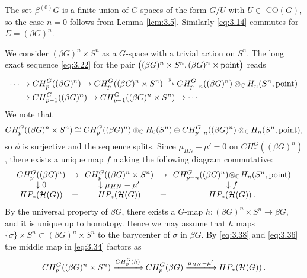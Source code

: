 The set $\beta^{(0)} G$ is a finite union of $G$-spaces of the form $G/U$ with 
$U \in$ CO$ (G)$, so the case $n = 0$ follows from Lemma \ref{lem:3.5}.
Similarly \eqref{eq:3.14} commutes for $\Sigma = (\beta G)^n$.

We consider $(\beta G)^n \times S^n$ as a $G$-space with a trivial action on $S^n$. The
long exact sequence \eqref{eq:3.22} for the pair 
$\big( (\beta G)^n \times S^n , (\beta G)^n \times \mathrm{point} \big)$ reads
\[
\begin{split}
\cdots & \to CH_p^G ((\beta G)^n ) \to CH_p^G ((\beta G)^n \times S^n ) \xrightarrow{\phi}
CH_{p-n}^G ((\beta G)^n ) \otimes_{\mathbb C} H_n (S^n ,\mathrm{point}) \\
& \to CH_{p-1}^G ((\beta G)^n ) \to CH_{p-1}^G ((\beta G)^n \times S^n ) \to \cdots
\end{split}
\]
We note that \pagebreak[3]
\begin{equation*}
CH_p^G ((\beta G)^n \times S^n ) \cong CH_p^G ((\beta G)^n ) \otimes_{\mathbb C} H_0 (S^n ) 
\oplus CH_{p-n}^G ((\beta G)^n ) \otimes_{\mathbb C} H_n (S^n ,\mathrm{point}) ,
\end{equation*}
so $\phi$ is surjective and the sequence splits. Since $\mu_{HN} - \mu' = 0$ on 
$CH_*^G ((\beta G)^n )$, there exists a unique map $f$ making the following diagram commutative:
\begin{equation}\label{eq:3.34}
\begin{array}{ccccc}
\!\! CH_p^G ((\beta G)^n ) \!\! & \to & \!\! CH_p^G ((\beta G)^n \times S^n ) \!\! & \to &
\!\! CH_{p-n}^G ((\beta G)^n ) \! \otimes_{\mh C} \! H_n (S^n ,\mr{point}) \!\! \\
\downarrow 0 & & \downarrow \mu_{HN} - \mu' & & \downarrow f \\
HP_* (\mc H (G)) & = & HP_* (\mc H (G)) & = & HP_* (\mc H (G)) \,. \\
\end{array}
\end{equation}
By the universal property of $\beta G$, there exists a $G$-map 
$h : (\beta G )^n \times S^n \to \beta G$, and it is unique up to homotopy. Hence we may 
assume that $h$ maps $\{ \sigma \} \times S^n \subset (\beta G )^n \times S^n$ to the 
barycenter of $\sigma$ in $\beta G$. By \eqref{eq:3.38} and \eqref{eq:3.36} the middle map 
in \eqref{eq:3.34} factors as
\begin{equation}\label{eq:3.35} 
CH_p^G ((\beta G)^n \times S^n ) \xrightarrow{CH_p^G (h)} CH_p^G (\beta G )  
\xrightarrow{\mu_{HN} - \mu'} HP_* (\mathcal H (G)) \,.
\end{equation}
